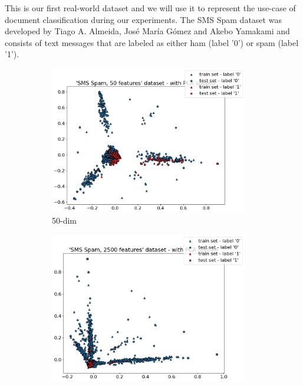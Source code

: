 This is our first real-world dataset and we will use it to represent the use-case of document classification during our experiments. The SMS Spam dataset was developed by Tiago A. Almeida, José María Gómez and Akebo Yamakami \cite{almeida_contributions_2011} and consists of text messages that are labeled as either ham (label '0') or spam (label '1').

\begin{figure}[h]
    \centering
    \begin{subfigure}[t]{0.32\textwidth}
        \centering
        \includegraphics[width=0.95\textwidth]{figures/'SMS Spam, 50 features' dataset - with PCA applied.png}
        \caption{50-dim}
    \end{subfigure}
    \begin{subfigure}[t]{0.32\textwidth}
        \centering
        \includegraphics[width=0.95\textwidth]{figures/'SMS Spam, 2500 features' dataset - with PCA applied.png}

\end{subfigure}
\end{figure}

